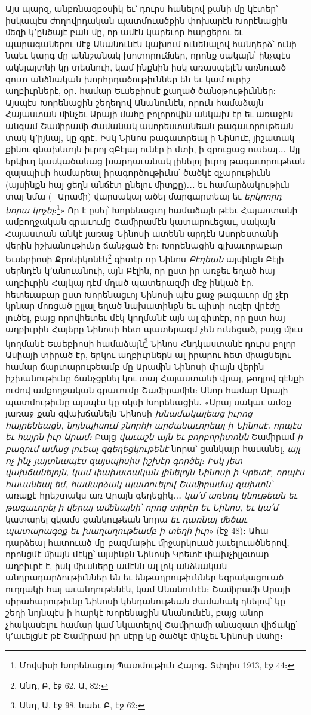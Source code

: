 \documentclass{article}
\begin{document}
{Այս պարզ, անբռնազբօսիկ եւ՝ դուրս հանելով քանի մը կէտեր՝ իսկապէս ժողովրդական պատմուածքին փոխարէն Խորէնացին ﬔզի կ՚ընծայէ բան մը, որ ամէն կարեւոր հարցերու եւ պարագաներու մէջ Անանունէն կախում ունենալով հանդերձ՝ ունի նաեւ կարգ մը աննշանակ խոտորուﬓեր, որոնք սակայն՝ ինչպէս ակնյայտնի կը տեսնուի, կամ ինքնին իսկ առասպելէն առնուած զուտ անձնական խորհրդածութիւններ են եւ կամ ուրիշ աղբիւրներէ, օր․ համար Եւսեբիոսէ քաղած ծանօթութիւններ։ Այսպէս Խորենացին շեղեղով Անանունէն, որուն համաձայն Հայաստան ﬕնչեւ Արայի մահը բոլորովին անկախ էր եւ առաջին անգամ Շաﬕրաﬕ ժամանակ ասորեստանեան թագաւորութեան տակ կ՚իյնայ, կը գրէ․ Իսկ Նինոս թագաւորեալ ի Նինուէ, յիշատակ քինու զնախնւոյն իւրոյ զԲէլայ ունէր ի մտի, ի զրուցաց ուսեալ․․․ Այլ երկիւղ կասկածանաց խարդաւանակ լինելոյ իւրոյ թագաւորութեան զայսպիսի համարեալ իրագործութիւնս՝ ծածկէ զչարութիւնն (այսինքն հայ ցեղն անճէտ ընելու ﬕտքը)․․․ եւ համարձակութիւն տայ նմա (=Արաﬕ) վարսակալ ածել մարգարտեայ եւ \emph{երկրորդ նորա կոչել}։\footnote{Մովսիսի Խորենացւոյ Պատմութիւն Հայոց․ Տփղիս 1913, էջ 44։}» Որ է ըսել՝ Խորենացւոյ համաձայն թէեւ Հայաստանի ամբողջական գրաւումը Շաﬕրամէն կատարուեցաւ, սակայն Հայաստան անկէ յառաջ Նինոսի ատենն արդէն Ասորեստանի վերին իշխանութիւնը ճանչցած էր։ Խորենացին գլխաւորաբար Եւսեբիոսի Քրոնիկոնէն\footnote{Անդ, Բ, էջ 62. Ա, 82։} գիտէր որ Նինոս \emph{Բէղեան} այսինքն Բէլի սերնդէն կ՚անուանուի, այն Բէլին, որ ըստ իր առջեւ եղած հայ աղբիւրին Հայկայ դէմ մղած պատերազﬕ մէջ ինկած էր․ հետեւաբար ըստ Խորենացւոյ Նինոսի պէս քաջ թագաւոր մը չէր կրնար մոռցած ըլլալ եղած նախատինքն եւ պիտի ուզէր վրէժը լուծել, բայց որովհետեւ մէկ կողմանէ այն ալ գիտէր, որ ըստ հայ աղբիւրին Հայերը Նինոսի հետ պատերազմ չեն ունեցած, բայց ﬕւս կողմանէ Եւսեբիոսի համաձայն\footnote{Անդ, Ա, էջ 98. նաեւ Բ, էջ 62։} Նինոս Հնդկաստանէ դուրս բոլոր Ասիայի տիրած էր, երկու աղբիւրներն ալ իրարու հետ ﬕացնելու համար ճարտարութեամբ մը Արաﬕն Նինոսի ﬕայն վերին իշխանութիւնը ճանչցընել կու տայ Հայաստանի վրայ, թողլով զէնքի ուժով ամքողջական գրաւումը Շաﬕրաﬕն։ Անոր համար Արայի պատմութիւնը այսպէս կը սկսի Խորենացին․ «Արայ սակաւ ամօք յառաջ քան զվախճանելն Նինոսի \emph{խնամակալեաց իւրոց հայրենեացն, նոյնպիսում շնորհի արժանաւորեալ ի Նինոսէ․ որպէս եւ հայրն իւր Արամ։} Բայց \emph{վաւաշն այն եւ բորբորիտոնն} Շաﬕրամ \emph{ի բազում ամաց լուեալ զգեղեցկութենէ} նորա՝ ցանկայր հասանել, \emph{այլ ոչ ինչ յայտնապէս զայսպիսիս իշխէր գործել։ Իսկ յետ վախճանելոյն, կամ փախստական լինելոյն Նինոսի ի Կրետէ, որպէս հաւանեալ եմ, համարձակ պատուելով Շաﬕրամայ զախտն՝} առաքէ հրեշտակս առ Արայն գեղեցիկ․․․ \emph{կա՛մ առնուլ կնութեան եւ թագաւորել ի վերայ աﬔնայնի՝ որոց տիրէր եւ Նինոս, եւ կա՛մ} կատարել զկամս ցանկութեան նորա \emph{եւ դառնալ ﬔծաւ պատարագօք եւ խաղաղութեամբ ի տեղի իւր}» (էջ 48)։ Ահա դարձեալ հատուած մը բազմաթիւ ﬕջարկուած յաւելուածներով, որոնցմէ ﬕայն մէկը՝ այսինքն Նինոսի Կրետէ փախչիլլօտար աղբիւրէ է, իսկ ﬕւսները ամէնն ալ լոկ անձնական անդրադարձութիւններ են եւ ենթադրութիւններ եզրակացուած ուղղակի հայ աւանդութենէն, կամ Անանունէն։ Շաﬕրաﬕ Արայի սիրահարութիւնը Նինոսի կենդանութեան ժամանակ դնելով՝ կը շեղի նոյնպէս ի հարկէ Խորենացին Անանունէն, բայց անոր չհակասելու համար կամ նկատելով Շաﬕրաﬕ անազատ վիճակը՝ կ՚աւելցնէ թէ Շաﬕրամ իր սէրը կը ծածկէ ﬕնչեւ Նինոսի մահը։

}
\end{document}
